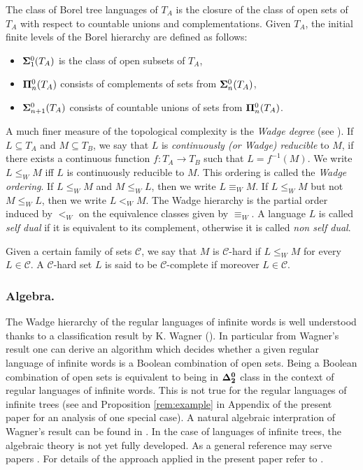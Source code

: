 The class of Borel tree languages of $T_A$ is the
closure of the class of open sets of $T_A$ with respect to countable unions and
complementations. Given $T_A$, the initial finite levels of the
Borel hierarchy are defined as follows: %
\begin{itemize}
\item ${\bf\Sigma}^0_1(T_A)$ is the class of open subsets of $T_A$, 
\item ${\bf\Pi}^0_n(T_A)$ consists of complements of sets from ${\bf\Sigma}^0_n(T_A)$, 
\item ${\bf\Sigma}^0_{n+1}(T_A)$ consists of countable unions of sets from ${\bf\Pi}^0_n(T_A)$. 
\end{itemize}
A much finer measure of the topological complexity is the \emph{Wadge degree} (see \cite[Chapter 21.E]{kechris}).
If $L \subseteq T_A$ and $M\subseteq T_B$, we say that $L$ is \emph{continuously (or Wadge)
reducible} to $M$, if there exists a continuous function $f: T_A \to T_B$ such that $L=
f^{-1}(M)$. We write $L \leq_W M$ iff $L$ is continuously reducible to $M$.
This ordering is called the {\em Wadge ordering}. If $L \leq_W M$ and $M \leq_W L$, then we write $L
\equiv_W M$. If $L \leq_W M$ but not $M \leq_W L$, then we write $L<_W
M$. The Wadge hierarchy is the partial order induced by $<_W$ on the
equivalence classes given by $\equiv_W$. A language  $L$ is called {\em self dual} if it is equivalent 
to its complement, otherwise it is called {\em non self dual}.

Given a certain family of sets $\mathcal{C}$, we say that $M$ is $\mathcal{C}$-hard if $L
\leq_W M$ for every $L \in \mathcal{C}$. A    $\mathcal{C}$-hard set $L$ is said to be $\mathcal{C}$-complete if 
moreover $L \in \mathcal{C}$.
\subsubsection*{Algebra.}
The Wadge hierarchy of the regular languages of infinite words is well understood thanks to a classification result by K. Wagner (\cite{wagner}). In particular from Wagner's result one can derive an algorithm which decides whether a given regular language of infinite words is a Boolean combination of open sets. Being a Boolean combination of open sets is equivalent to being in ${\bf \Delta^0_2}$ class in the context of regular languages of infinite words. This is not true for the regular languages of infinite trees (see \cite[Section 4.1]{bp} and Proposition \ref{rem:example} in Appendix of the present paper for an analysis of one special case).   A natural algebraic interpration of Wagner's result can be found in \cite[Theorem V.6.2]{pinperrin}. In the case of languages of infinite trees, the algebraic theory is not yet fully developed. As a general reference may serve papers \cite{blumensath,bp,bojtrees,bojidziaszek}. For details of the approach applied in the present paper refer to \cite[Section 3]{bp}. 

